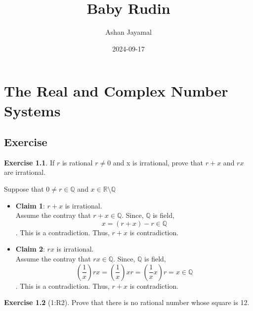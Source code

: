 \documentclass[
]{book}
\title{Baby Rudin}
\author{Ashan Jayamal}
\date{2024-09-17}
\theoremstyle{definition}
\theoremstyle{definition}
\theoremstyle{definition}
\newtheorem{exercise}{Exercise}[chapter]
\theoremstyle{definition}
\theoremstyle{remark}
\begin{document}
\maketitle

{
\setcounter{tocdepth}{1}
\tableofcontents
}
\chapter{The Real and Complex Number Systems}\label{the-real-and-complex-number-systems}

\section{Exercise}\label{exercise}

\begin{exercise}
\protect\hypertarget{exr:unnamed-chunk-1}{}\label{exr:unnamed-chunk-1}If \(r\) is rational \(r\neq 0\) and x is irrational, prove that \(r + x\) and \(rx\) are irrational.
\end{exercise}

Suppose that \(0 \neq r \in \mathbb{Q}\) and \(x\in \mathbb{R}\setminus \mathbb{Q}\)

\begin{itemize}
\item
  \textbf{Claim 1}: \(r+x\) is irrational.\\
  Assume the contray that \(r+x\in \mathbb{Q}\). Since, \(\mathbb{Q}\) is field,
  \[x=(r+x)-r\in \mathbb{Q}\]. This is a contradiction. Thus, \(r+x\) is contradiction.
\item
  \textbf{Claim 2}: \(rx\) is irrational.\\
  Assume the contray that \(rx\in \mathbb{Q}\). Since, \(\mathbb{Q}\) is field,
  \[\left(\frac{1}{x}\right)rx=\left(\frac{1}{x}\right)xr=\left(\frac{1}{x}x\right)r=x\in \mathbb{Q}\]. This is a contradiction. Thus, \(r+x\) is contradiction.
\end{itemize}

\begin{exercise}[1:R2]
\protect\hypertarget{exr:unnamed-chunk-2}{}\label{exr:unnamed-chunk-2}Prove that there is no rational number whose square is 12.
\end{exercise}
\end{document}
